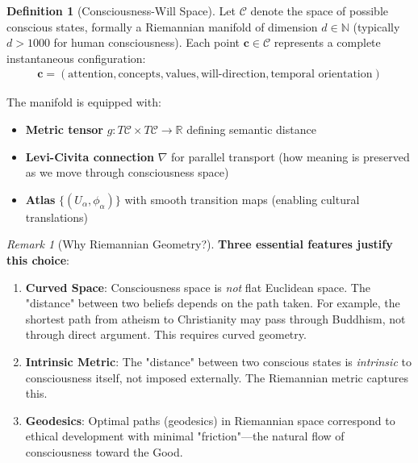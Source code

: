 \documentclass[11pt,a4paper]{article}
\theoremstyle{definition}
\newtheorem{definition}{Definition}[section]
\theoremstyle{remark}
\newtheorem{remark}{Remark}[section]
\newcommand{\RR}{\mathbb{R}}
\newcommand{\CC}{\mathcal{C}}
\newcommand{\cc}{\mathbf{c}}
\begin{document}
\begin{definition}[Consciousness-Will Space]
Let \(\CC\) denote the space of possible conscious states, formally a Riemannian manifold of dimension \(d \in \mathbb{N}\) (typically \(d > 1000\) for human consciousness). Each point \(\cc \in \CC\) represents a complete instantaneous configuration:
\begin{align}
\cc = (\text{attention}, \text{concepts}, \text{values}, \text{will-direction}, \text{temporal orientation})
\end{align}

The manifold is equipped with:
\begin{itemize}
\item \textbf{Metric tensor} \(g: T\CC \times T\CC \rightarrow \RR\) defining semantic distance
\item \textbf{Levi-Civita connection} \(\nabla\) for parallel transport (how meaning is preserved as we move through consciousness space)
\item \textbf{Atlas} \(\{(U_\alpha, \phi_\alpha)\}\) with smooth transition maps (enabling cultural translations)
\end{itemize}
\end{definition}

\begin{remark}[Why Riemannian Geometry?]
\textbf{Three essential features justify this choice}:

\begin{enumerate}
    \item \textbf{Curved Space}: Consciousness space is \textit{not} flat Euclidean space. The "distance" between two beliefs depends on the path taken. For example, the shortest path from atheism to Christianity may pass through Buddhism, not through direct argument. This requires curved geometry.
    
    \item \textbf{Intrinsic Metric}: The "distance" between two conscious states is \textit{intrinsic} to consciousness itself, not imposed externally. The Riemannian metric captures this.
    
    \item \textbf{Geodesics}: Optimal paths (geodesics) in Riemannian space correspond to ethical development with minimal "friction"—the natural flow of consciousness toward the Good.
\end{enumerate}
\end{remark}
\end{document}
